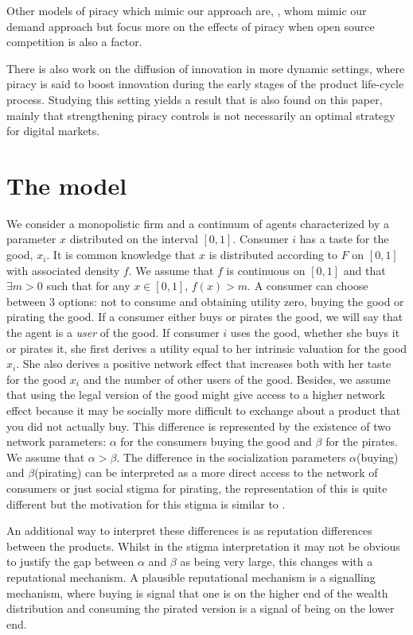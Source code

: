 \documentclass[11pt]{article}
\begin{document}
Other models of piracy which mimic our approach are, \cite{MRSS17}, whom mimic our demand approach but focus more on the effects of piracy when open source competition is also a factor.

There is also work on the diffusion of innovation in more dynamic settings, where piracy is said to boost innovation during the early stages of the product life-cycle process. Studying this setting yields a result that is also found on this paper, mainly that strengthening piracy controls is not necessarily an optimal strategy for digital markets. \citep{G03}  \citep{GMM95}


\section{The model}

We consider a monopolistic firm and a continuum of agents characterized by a parameter $x$ distributed on the interval $[0,1]$. Consumer $i$ has a taste for the good, $x_i$. It is common knowledge that $x$ is distributed according to $F$ on $[0,1]$ with associated density $f$. We assume that $f$ is continuous on $[0,1]$ and that $\exists m>0$ such that for any $x \in [0,1]$, $f(x)>m$. A consumer can choose between 3 options: not to consume and obtaining utility zero, buying the good or pirating the good. If a consumer either buys or pirates the good, we will say that the agent is a \textit{user} of the good. If consumer $i$ uses the good, whether she buys it or pirates it, she first derives a utility equal to her intrinsic valuation for the good $x_i$. She also derives a positive network effect that increases both with her taste for the good $x_i$ and the number of other users of the good. Besides, we assume that using the legal version of the good might give access to a higher network effect because it may be socially more difficult to exchange about a product that you did not actually buy. This difference is represented by the existence of two network parameters: $\alpha$ for the consumers buying the good and $\beta$ for the pirates. We assume that $\alpha > \beta$. The difference in the socialization parameters $\alpha$(buying) and $\beta$(pirating) can be interpreted as a more direct access to the network of consumers or just social stigma for pirating, the representation of this is quite different but the motivation for this stigma is similar to  \cite{CRP91}. 

An additional way to interpret these differences is as reputation differences between the products. Whilst in the stigma interpretation it may not be obvious to justify the gap between $\alpha$ and $\beta$ as being very large, this changes with a reputational mechanism. A plausible reputational mechanism is a signalling mechanism, where buying is signal that one is on the higher end of the wealth distribution and consuming the pirated version is a signal of being on the lower end. 
\end{document}
